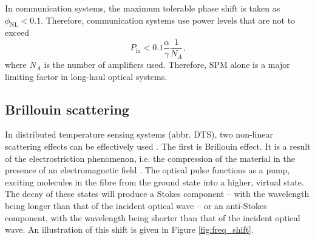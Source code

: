 \documentclass{standalone}
\begin{document}
In communication systems, the maximum tolerable phase shift is taken as $\phi_\textrm{NL} < 0.1$. Therefore, communication systems use power levels that are not to exceed
\begin{equation}
P_\textrm{in} < 0.1 \frac{\alpha}{\gamma} \frac{1}{N_A} \textrm{,}
\end{equation}
where $N_A$ is the number of amplifiers used. Therefore, SPM alone is a major limiting factor in long-haul optical systems.


\subsection{Brillouin scattering}

In distributed temperature sensing systems (abbr. DTS), two non-linear scattering effects can be effectively used \cite{epflBookInelastic}. The first is Brillouin effect. It is a result of the electrostriction phenomenon, i.e. the compression of the material in the presence of an electromagnetic field \cite{agrawalNonlinear}. The optical pulse functions as a pump, exciting molecules in the fibre from the ground state into a higher, virtual state. The decay of these states will produce a Stokes component -- with the wavelength being longer than that of the incident optical wave -- or an anti-Stokes component, with the wavelength being shorter than that of the incident optical wave. An illustration of this shift is given in Figure \ref{fig:freq_shift}.
\end{document}
